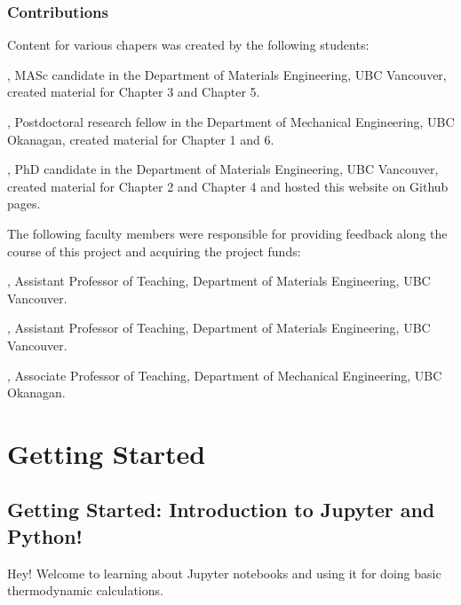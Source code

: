 \documentclass[letterpaper,10pt,english]{jupyterBook}
\begin{document}
\section{Contributions}
\label{\detokenize{notebooks/ack/ack:contributions}}
\sphinxAtStartPar
Content for various chapers was created by the following students:

\sphinxAtStartPar
{}, MASc candidate in the Department of Materials Engineering, UBC Vancouver, created material for Chapter 3 and Chapter 5.

\sphinxAtStartPar
{}, Postdoctoral research fellow in the Department of Mechanical Engineering, UBC Okanagan, created material for Chapter 1 and 6.

\sphinxAtStartPar
{}, PhD candidate in the Department of Materials Engineering, UBC Vancouver, created material for Chapter 2 and Chapter 4 and hosted this website on Github pages.

\sphinxAtStartPar
The following faculty members were responsible for providing feedback along the course of this project and acquiring the project funds:

\sphinxAtStartPar
{}, Assistant Professor of Teaching, Department of Materials Engineering, UBC Vancouver.

\sphinxAtStartPar
{}, Assistant Professor of Teaching, Department of Materials Engineering, UBC Vancouver.

\sphinxAtStartPar
{}, Associate Professor of Teaching, Department of Mechanical Engineering, UBC Okanagan.

\sphinxstepscope


\part{Getting Started}

\sphinxstepscope


\chapter{Getting Started: Introduction to Jupyter and Python!}
\label{\detokenize{notebooks/getting_started/getting_started:getting-started-introduction-to-jupyter-and-python}}\label{\detokenize{notebooks/getting_started/getting_started::doc}}
\sphinxAtStartPar
Hey! Welcome to learning about Jupyter notebooks and using it for doing basic thermodynamic calculations.
\end{document}
